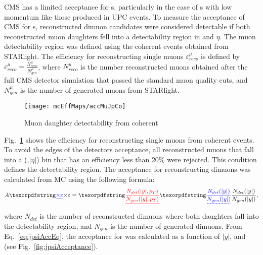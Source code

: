      CMS has a limited acceptance for \JPsi{}s, particularly in the case of 
        \JPsi{}s with low momentum like those produced in UPC events. 
      To measure the acceptance of CMS for \JPsi{}s, reconstructed dimuon 
        candidates were considered detectable if both reconstructed muon 
        daughters fell into a detectability region in \pt{} and $\eta$.
      The muon detectability region was defined using the coherent \JPsi{} 
        events obtained from STARlight.
      The efficiency for reconstructing single muons $\varepsilon^{\mu}_{reco}$ 
        is defined by $\varepsilon^{\mu}_{reco} = \frac{N^{\mu}_{reco}}{N^{\mu}_{gen}}$, 
        where $N^{\mu}_{reco}$ is the number reconstructed muons obtained 
        after the full CMS detector simulation \DIFdelbegin {}\DIFdelend that passed the standard
        muon quality cuts, and $N^{\mu}_{gen}$ is the number of generated 
        muons from STARlight.
      \begin{figure}[!Hhtb]
        \centering
          \texttt{[image: mcEffMaps/accMuJpCo]} 
        \caption{ Muon daughter detectability from coherent \JPsi{}}
        \label{fig:muonDaughterDet}
      \end{figure}
      Fig.~\ref{fig:muonDaughterDet} shows the efficiency for reconstructing
        single muons from coherent \JPsi{} events.
      To avoid the edges of the detectors acceptance, all reconstructed muons 
        that fall into a (\pt{},$|\eta|$) bin that has an efficiency less 
        than 20\% were rejected.
      This condition defines the detectability region.
      The acceptance \DIFaddbegin {}\DIFaddend for reconstructing dimuons 
        was calculated from MC using the following formula:
      \begin{equation}
        A \DIFaddbegin \DIFadd{\times \varepsilon}\DIFaddend =\DIFdelbegin \DIFdel{\frac{N_{det}(|y|,p_{T})}{N_{gen}(|y|,p_{T})}}\DIFdelend \DIFaddbegin \DIFadd{\frac{N_{det}(|y|)}{N_{gen}(|y|)}}\DIFaddend ,
        \label{eq:jpsiAccEq}
      \end{equation}
        where $N_{det}$ is the number of reconstructed dimuons where both 
        daughters fall into the detectability region, and $N_{gen}$ is the
        number of generated dimuons. 
      From Eq.~\ref{eq:jpsiAccEq}, the acceptance for \JPsi{} was calculated
        as a function of $|y|$, and \pt{} (see Fig.~\ref{fig:jpsiAcceptance}).
        \DIFdelbegin %
